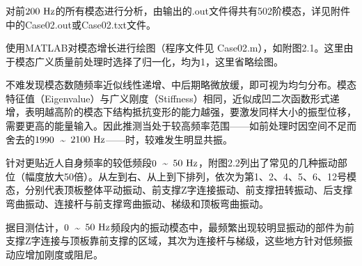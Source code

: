 \documentclass[12pt, oneside, a4paper]{ctexart}
\begin{document}
\subsubsection{}
\par{}
对前$\rm 200~Hz$的所有模态进行分析，由输出的.out文件得共有502阶模态，详见附件中的Case02.out或Case02.txt文件。
\par{}
使用MATLAB对模态增长进行绘图（程序文件见 Case02.m），如附图2.1。这里由于模态广义质量前处理时选择了归一化，均为1，这里省略绘图。
\par{}
不难发现模态数随频率近似线性递增、中后期略微放缓，即可视为均匀分布。模态特征值（Eigenvalue）与广义刚度（Stiffness）相同，近似成凹二次函数形式递增，表明越高阶的模态下结构抵抗变形的能力越强，要激发同样大小的振型位移，需要更高的能量输入。因此推测当处于较高频率范围——如前处理时因空间不足而舍去的$\rm 1990$~\textasciitilde~$\rm 2100~Hz$——时，较难发生明显共振。
\par{}
针对更贴近人自身频率的较低频段$\rm 0$~\textasciitilde~$\rm 50~Hz$，附图2.2列出了常见的几种振动部位（幅度放大50倍）。从左到右、从上到下排列，依次为第1、2、4、5、6、12号模态，分别代表顶板整体平动振动、前支撑Z字连接振动、前支撑扭转振动、后支撑弯曲振动、连接杆与前支撑弯曲振动、梯级和顶板弯曲振动。
\par{}
据目测估计，$\rm 0$~\textasciitilde~$\rm 50~Hz$频段内的振动模态中，最频繁出现较明显振动的部件为前支撑Z字连接与顶板靠前支撑的区域，其次为连接杆与梯级，这些地方针对低频振动应增加刚度或阻尼。
\end{document}
